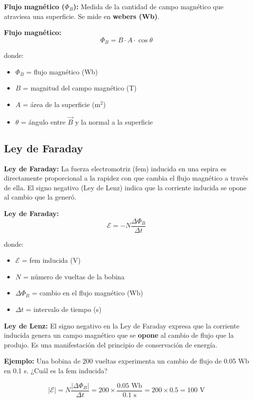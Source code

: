 \begin{seccion}
\begin{definicion}
\textbf{Flujo magnético ($\Phi_B$):} Medida de la cantidad de campo magnético que atraviesa una superficie. Se mide en \textbf{webers (Wb)}.
\end{definicion}

\begin{ecuacion}
\textbf{Flujo magnético:}
$$\Phi_B = B \cdot A \cdot \cos\theta$$

donde:
\begin{itemize}
    \item $\Phi_B$ = flujo magnético (Wb)
    \item $B$ = magnitud del campo magnético (T)
    \item $A$ = área de la superficie (m$^2$)
    \item $\theta$ = ángulo entre $\vec{B}$ y la normal a la superficie
\end{itemize}
\end{ecuacion}
\end{seccion}

\subsection{Ley de Faraday}

\begin{seccion}
\begin{definicion}
\textbf{Ley de Faraday:} La fuerza electromotriz (fem) inducida en una espira es directamente proporcional a la rapidez con que cambia el flujo magnético a través de ella. El signo negativo (Ley de Lenz) indica que la corriente inducida se opone al cambio que la generó.
\end{definicion}

\begin{ecuacion}
\textbf{Ley de Faraday:}
$$\mathcal{E} = -N \frac{\Delta\Phi_B}{\Delta t}$$

donde:
\begin{itemize}
    \item $\mathcal{E}$ = fem inducida (V)
    \item $N$ = número de vueltas de la bobina
    \item $\Delta\Phi_B$ = cambio en el flujo magnético (Wb)
    \item $\Delta t$ = intervalo de tiempo (s)
\end{itemize}
\end{ecuacion}

\begin{nota}
\textbf{Ley de Lenz:} El signo negativo en la Ley de Faraday expresa que la corriente inducida genera un campo magnético que se \textbf{opone} al cambio de flujo que la produjo. Es una manifestación del principio de conservación de energía.
\end{nota}

\textbf{Ejemplo:} Una bobina de 200 vueltas experimenta un cambio de flujo de 0.05 Wb en 0.1 s. ¿Cuál es la fem inducida?

$$|\mathcal{E}| = N \frac{|\Delta\Phi_B|}{\Delta t} = 200 \times \frac{0.05 \text{ Wb}}{0.1 \text{ s}} = 200 \times 0.5 = 100 \text{ V}$$
\end{seccion}

